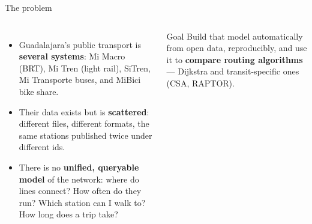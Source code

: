 \documentclass[aspectratio=169,10pt]{beamer}
\begin{document}
\begin{frame}{The problem}
  \begin{columns}[T]
    \small
    \begin{itemize}
      \item Guadalajara's public transport is \textbf{several systems}: Mi Macro (BRT), Mi Tren
            (light rail), SiTren, Mi Transporte buses, and MiBici bike share.
      \item Their data exists but is \textbf{scattered}: different files, different formats, the
            same stations published twice under different ids.
      \item There is no \textbf{unified, queryable model} of the network: where do lines connect?
            How often do they run? Which station can I walk to? How long does a trip take?
    \end{itemize}
    \vskip0.15cm
    \begin{exampleblock}{Goal}
      \small Build that model automatically from open data, reproducibly, and use it to
      \textbf{compare routing algorithms} --- Dijkstra and transit-specific ones (CSA, RAPTOR).
    \end{exampleblock}
    \centering
  \end{columns}
\end{frame}
\end{document}
